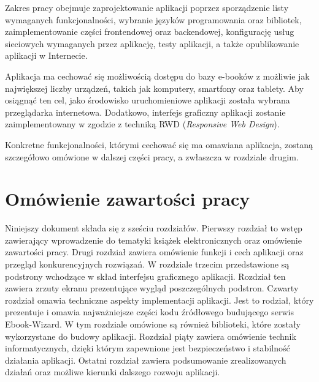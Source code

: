 Zakres pracy obejmuje zaprojektowanie aplikacji poprzez sporządzenie listy wymaganych funkcjonalności, wybranie języków programowania oraz bibliotek, zaimplementowanie części frontendowej oraz backendowej, konfigurację usług sieciowych wymaganych przez aplikację, testy aplikacji, a także opublikowanie aplikacji w Internecie.

Aplikacja ma cechować się możliwością dostępu do bazy e-booków z możliwie jak największej liczby urządzeń, takich jak komputery, smartfony oraz tablety. Aby osiągnąć ten cel, jako środowisko uruchomieniowe aplikacji została wybrana przeglądarka internetowa. Dodatkowo, interfejs graficzny aplikacji zostanie zaimplementowany w zgodzie z techniką RWD (\textit{Responsive Web Design}). 

Konkretne funkcjonalności, którymi cechować się ma omawiana aplikacja, zostaną szczegółowo omówione w dalszej części pracy, a zwłaszcza w rozdziale drugim.

\section{Omówienie zawartości pracy}
\label{sec:1:chapter2}

Niniejszy dokument składa się z sześciu rozdziałów. Pierwszy rozdział to wstęp zawierający wprowadzenie do tematyki książek elektronicznych oraz omówienie zawartości pracy. Drugi rozdział zawiera omówienie funkcji i cech aplikacji oraz przegląd konkurencyjnych rozwiązań. W rozdziale trzecim przedstawione są podstrony wchodzące w skład interfejsu graficznego aplikacji. Rozdział ten zawiera zrzuty ekranu prezentujące wygląd poszczególnych podstron. Czwarty rozdział omawia techniczne aspekty implementacji aplikacji. Jest to rodział, który prezentuje i omawia najważniejsze części kodu źródłowego budującego serwis Ebook-Wizard. W tym rozdziale omówione są również biblioteki, które zostały wykorzystane do budowy aplikacji. Rozdział piąty zawiera omówienie technik informatycznych, dzięki którym zapewnione jest bezpieczeństwo i stabilność działania aplikacji. Ostatni rozdział zawiera podsumowanie zrealizowanych działań oraz możliwe kierunki dalszego rozwoju aplikacji.

